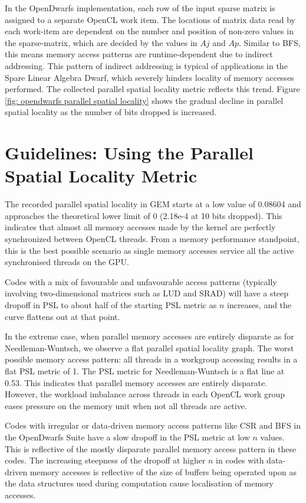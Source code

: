 \documentclass[review=false, sigchi]{acmart}
\begin{document}
	In the OpenDwarfs implementation, each row of the input sparse matrix is assigned to a separate OpenCL work item. 
	The locations of matrix data read by each work-item are dependent on the number and position of non-zero values in the sparse-matrix, which are decided by the values in $Aj$ and $Ap$. 
	Similar to BFS, this means memory access patterns are runtime-dependent due to indirect addressing.
	This pattern of indirect addressing is typical of applications in the Spare Linear Algebra Dwarf, which severely hinders locality of memory accesses performed. The collected parallel spatial locality metric reflects this trend. Figure \ref{fig: opendwarfs parallel spatial locality} shows the gradual decline in parallel spatial locality as the number of bits dropped is increased.
	
	\section{Guidelines: Using the Parallel Spatial Locality Metric}
	
	 The recorded parallel spatial locality in GEM starts at a low value of 0.08604 and approaches the theoretical lower limit of 0 (2.18e-4 at 10 bits dropped). This indicates that almost all memory accesses made by the kernel are perfectly synchronized between OpenCL threads. From a memory performance standpoint, this is the best possible scenario as single memory accesses service all the active synchronised threads on the GPU.
	 
	 Codes with a mix of favourable and unfavourable access patterns (typically involving two-dimensional matrices such as LUD and SRAD) will have a steep dropoff in PSL to about half of the starting PSL metric as $n$ increases, and the curve flattens out at that point.
	 
	 In the extreme case, when parallel memory accesses are entirely disparate as for Needleman-Wuntsch, we observe a flat parallel spatial locality graph. 
	 The worst possible memory access pattern: all threads in a workgroup accessing results in a flat PSL metric of 1. 
	 The PSL metric for Needleman-Wuntsch is a flat line at 0.53. This indicates that parallel memory accesses are entirely disparate. 
	 However, the workload imbalance across threads in each OpenCL work group eases pressure on the memory unit when not all threads are active.
	 
	 Codes with irregular or data-driven memory access patterns like CSR and BFS in the OpenDwarfs Suite have a slow dropoff in the PSL metric at low $n$ values. This is reflective of the mostly disparate parallel memory access pattern in these codes. The increasing steepness of the dropoff at higher $n$ in codes with data-driven memory accesses is reflective of the size of buffers being operated upon as the data structures used during computation cause localisation of memory accesses.
	 
\end{document}
